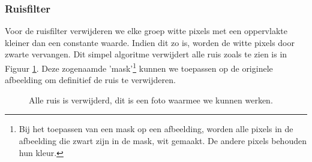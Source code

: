 \documentclass[a4paper,kulak]{kulakarticle}
\begin{document}
	\subsubsection{Ruisfilter}
		Voor de ruisfilter verwijderen we elke groep witte pixels met een oppervlakte kleiner dan een constante waarde. Indien dit zo is, worden de witte pixels door zwarte vervangen. Dit simpel algoritme verwijdert alle ruis zoals te zien is in Figuur \ref{figuur ruisfilter}. Deze zogenaamde 'mask'\footnote{Bij het toepassen van een mask op een afbeelding, worden alle pixels in de afbeelding die zwart zijn in de mask, wit gemaakt. De andere pixels behouden hun kleur.} kunnen we toepassen op de originele afbeelding om definitief de ruis te verwijderen.

	\begin{figure}[h!]
		\centering
		\qquad
		
		\caption{Alle ruis is verwijderd, dit is een foto waarmee we kunnen werken.}
		\label{figuur ruisfilter}
	\end{figure}
	
	\newpage
\end{document}
